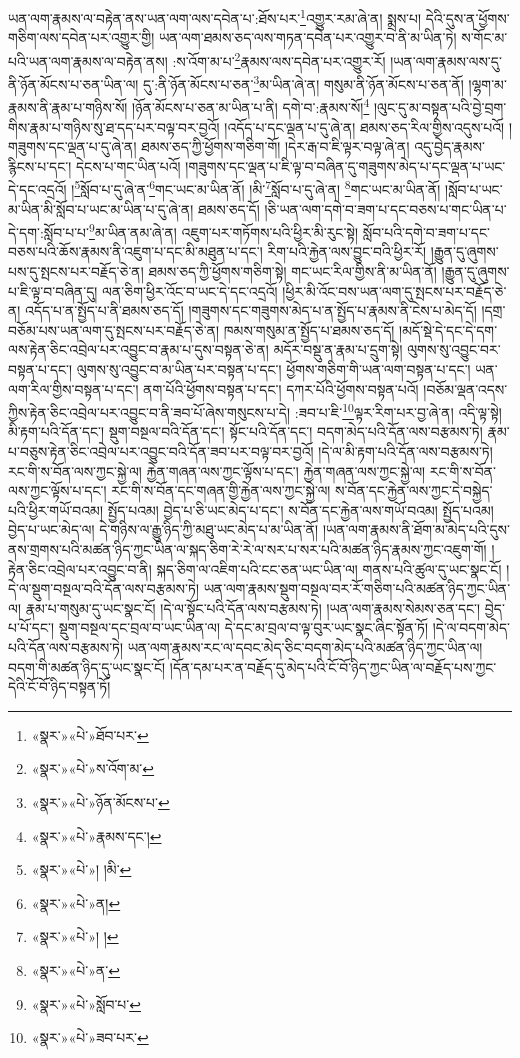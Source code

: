 ཡན་ལག་རྣམས་ལ་བརྟེན་ནས་ཡན་ལག་ལས་དབེན་པ་:ཐོས་པར་\footnote{«སྣར་»«པེ་»ཐོབ་པར་}འགྱུར་རམ་ཞེ་ན། སྨྲས་པ། དེའི་དུས་ན་ཕྱོགས་གཅིག་ལས་དབེན་པར་འགྱུར་གྱི། ཡན་ལག་ཐམས་ཅད་ལས་གཏན་དབེན་པར་འགྱུར་བ་ནི་མ་ཡིན་ཏེ། ས་གོང་མ་པའི་ཡན་ལག་རྣམས་ལ་བརྟེན་ནས། :ས་འོག་མ་པ་\footnote{«སྣར་»«པེ་»ས་འོག་མ་}རྣམས་ལས་དབེན་པར་འགྱུར་རོ། །ཡན་ལག་རྣམས་ལས་དུ་ནི་ཉོན་མོངས་པ་ཅན་ཡིན་ལ། དུ་:ནི་ཉོན་མོངས་པ་ཅན་\footnote{«སྣར་»«པེ་»ཉོན་མོངས་པ་}མ་ཡིན་ཞེ་ན། གསུམ་ནི་ཉོན་མོངས་པ་ཅན་ནོ། །ལྷག་མ་རྣམས་ནི་རྣམ་པ་གཉིས་སོ། །ཉོན་མོངས་པ་ཅན་མ་ཡིན་པ་ནི། དགེ་བ་:རྣམས་སོ།\footnote{«སྣར་»«པེ་»རྣམས་དང་།} །ལུང་དུ་མ་བསྟན་པའི་བྱེ་བྲག་གིས་རྣམ་པ་གཉིས་སུ་ཐ་དད་པར་བལྟ་བར་བྱའོ། །འདོད་པ་དང་ལྡན་པ་དུ་ཞེ་ན། ཐམས་ཅད་རིལ་གྱིས་འདུས་པའོ། །གཟུགས་དང་ལྡན་པ་དུ་ཞེ་ན། ཐམས་ཅད་ཀྱི་ཕྱོགས་གཅིག་གོ། །དེར་རྒ་བ་ཇི་ལྟར་བལྟ་ཞེ་ན། འདུ་བྱེད་རྣམས་རྙིངས་པ་དང་། དེངས་པ་གང་ཡིན་པའོ། །གཟུགས་དང་ལྡན་པ་ཇི་ལྟ་བ་བཞིན་དུ་གཟུགས་མེད་པ་དང་ལྡན་པ་ཡང་དེ་དང་འདྲའོ། །\footnote{«སྣར་»«པེ་»། །མི་}སློབ་པ་དུ་ཞེ་ན་\footnote{«སྣར་»«པེ་»ན། }གང་ཡང་མ་ཡིན་ནོ། །མི་\footnote{«སྣར་»«པེ་»། །}སློབ་པ་དུ་ཞེ་ན། \footnote{«སྣར་»«པེ་»ན་}གང་ཡང་མ་ཡིན་ནོ། །སློབ་པ་ཡང་མ་ཡིན་མི་སློབ་པ་ཡང་མ་ཡིན་པ་དུ་ཞེ་ན། ཐམས་ཅད་དོ། །ཅི་ཡན་ལག་དགེ་བ་ཟག་པ་དང་བཅས་པ་གང་ཡིན་པ་དེ་དག་:སློབ་པ་པ་\footnote{«སྣར་»«པེ་»སློབ་པ་}མ་ཡིན་ནམ་ཞེ་ན། འཇུག་པར་གཏོགས་པའི་ཕྱིར་མི་རུང་སྟེ། སློབ་པའི་དགེ་བ་ཟག་པ་དང་བཅས་པའི་ཆོས་རྣམས་ནི་འཇུག་པ་དང་མི་མཐུན་པ་དང་། རིག་པའི་རྐྱེན་ལས་བྱུང་བའི་ཕྱིར་རོ། །རྒྱུན་དུ་ཞུགས་པས་དུ་སྤངས་པར་བརྗོད་ཅེ་ན། ཐམས་ཅད་ཀྱི་ཕྱོགས་གཅིག་སྟེ། གང་ཡང་རིལ་གྱིས་ནི་མ་ཡིན་ནོ། །རྒྱུན་དུ་ཞུགས་པ་ཇི་ལྟ་བ་བཞིན་དུ། ལན་ཅིག་ཕྱིར་འོང་བ་ཡང་དེ་དང་འདྲའོ། །ཕྱིར་མི་འོང་བས་ཡན་ལག་དུ་སྤངས་པར་བརྗོད་ཅེ་ན། འདོད་པ་ན་སྤྱོད་པ་ནི་ཐམས་ཅད་དོ། །གཟུགས་དང་གཟུགས་མེད་པ་ན་སྤྱོད་པ་རྣམས་ནི་ངེས་པ་མེད་དོ། །དགྲ་བཅོམ་པས་ཡན་ལག་དུ་སྤངས་པར་བརྗོད་ཅེ་ན། ཁམས་གསུམ་ན་སྤྱོད་པ་ཐམས་ཅད་དོ། །མདོ་སྡེ་དེ་དང་དེ་དག་ལས་རྟེན་ཅིང་འབྲེལ་པར་འབྱུང་བ་རྣམ་པ་དུས་བསྟན་ཅེ་ན། མདོར་བསྡུ་ན་རྣམ་པ་དྲུག་སྟེ། ལུགས་སུ་འབྱུང་བར་བསྟན་པ་དང་། ལུགས་སུ་འབྱུང་བ་མ་ཡིན་པར་བསྟན་པ་དང་། ཕྱོགས་གཅིག་གི་ཡན་ལག་བསྟན་པ་དང་། ཡན་ལག་རིལ་གྱིས་བསྟན་པ་དང་། ནག་པོའི་ཕྱོགས་བསྟན་པ་དང་། དཀར་པོའི་ཕྱོགས་བསྟན་པའོ། །བཅོམ་ལྡན་འདས་ཀྱིས་རྟེན་ཅིང་འབྲེལ་པར་འབྱུང་བ་ནི་ཟབ་པོ་ཞེས་གསུངས་པ་དེ། :ཟབ་པ་ཇི་\footnote{«སྣར་»«པེ་»ཟབ་པར་}ལྟར་རིག་པར་བྱ་ཞེ་ན། འདི་ལྟ་སྟེ། མི་རྟག་པའི་དོན་དང་། སྡུག་བསྔལ་བའི་དོན་དང་། སྟོང་པའི་དོན་དང་། བདག་མེད་པའི་དོན་ལས་བརྩམས་ཏེ། རྣམ་པ་བཅུས་རྟེན་ཅིང་འབྲེལ་པར་འབྱུང་བའི་དོན་ཟབ་པར་བལྟ་བར་བྱའོ། །དེ་ལ་མི་རྟག་པའི་དོན་ལས་བརྩམས་ཏེ། རང་གི་ས་བོན་ལས་ཀྱང་སྐྱེ་ལ། རྐྱེན་གཞན་ལས་ཀྱང་ལྟོས་པ་དང་། རྐྱེན་གཞན་ལས་ཀྱང་སྐྱེ་ལ། རང་གི་ས་བོན་ལས་ཀྱང་ལྟོས་པ་དང་། རང་གི་ས་བོན་དང་གཞན་གྱི་རྐྱེན་ལས་ཀྱང་སྐྱེ་ལ། ས་བོན་དང་རྐྱེན་ལས་ཀྱང་དེ་བསྐྱེད་པའི་ཕྱིར་གཡོ་བའམ། སྤྱོད་པའམ། བྱེད་པ་ཅི་ཡང་མེད་པ་དང་། ས་བོན་དང་རྐྱེན་ལས་གཡོ་བའམ། སྤྱོད་པའམ། བྱེད་པ་ཡང་མེད་ལ། དེ་གཉིས་ལ་རྒྱུ་ཉིད་ཀྱི་མཐུ་ཡང་མེད་པ་མ་ཡིན་ནོ། །ཡན་ལག་རྣམས་ནི་ཐོག་མ་མེད་པའི་དུས་ནས་གྲགས་པའི་མཚན་ཉིད་ཀྱང་ཡིན་ལ་སྐད་ཅིག་རེ་རེ་ལ་སར་པ་སར་པའི་མཚན་ཉིད་རྣམས་ཀྱང་འཇུག་གོ། །རྟེན་ཅིང་འབྲེལ་པར་འབྱུང་བ་ནི། སྐད་ཅིག་ལ་འཇིག་པའི་ངང་ཅན་ཡང་ཡིན་ལ། གནས་པའི་ཚུལ་དུ་ཡང་སྣང་ངོ། །དེ་ལ་སྡུག་བསྔལ་བའི་དོན་ལས་བརྩམས་ཏེ། ཡན་ལག་རྣམས་སྡུག་བསྔལ་བར་རོ་གཅིག་པའི་མཚན་ཉིད་ཀྱང་ཡིན་ལ། རྣམ་པ་གསུམ་དུ་ཡང་སྣང་ངོ། །དེ་ལ་སྟོང་པའི་དོན་ལས་བརྩམས་ཏེ། །ཡན་ལག་རྣམས་སེམས་ཅན་དང་། བྱེད་པ་པོ་དང་། སྡུག་བསྔལ་དང་བྲལ་བ་ཡང་ཡིན་ལ། དེ་དང་མ་བྲལ་བ་ལྟ་བུར་ཡང་སྣང་ཞིང་སྟོན་ཏོ། །དེ་ལ་བདག་མེད་པའི་དོན་ལས་བརྩམས་ཏེ། ཡན་ལག་རྣམས་རང་ལ་དབང་མེད་ཅིང་བདག་མེད་པའི་མཚན་ཉིད་ཀྱང་ཡིན་ལ། བདག་གི་མཚན་ཉིད་དུ་ཡང་སྣང་ངོ། །དོན་དམ་པར་ན་བརྗོད་དུ་མེད་པའི་ངོ་བོ་ཉིད་ཀྱང་ཡིན་ལ་བརྗོད་པས་ཀྱང་དེའི་ངོ་བོ་ཉིད་བསྟན་ཏོ། 